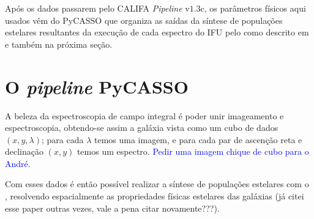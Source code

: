 Após os dados passarem pelo CALIFA {\em Pipeline} v$1.3$c, os parâmetros físicos
aqui usados vêm do PyCASSO que organiza as saídas da síntese de populações
estelares resultantes da execução de cada espectro do IFU pelo \starlight
\citep{CidFernandes2005} como descrito em \citet{CidFernandes2013a} e também na
próxima seção.


\section{O {\em pipeline} PyCASSO}
\label{sec:CALePyC:PyCASSO}

A beleza da espectroscopia de campo integral é poder unir imageamento e
espectroscopia, obtendo-se assim a galáxia vista como um cubo de dados  $(x, y,
\lambda)$; para cada $\lambda$ temos uma imagem, e para cada par de ascenção
reta e declinação $(x, y)$ temos um espectro. \ojo \textcolor{blue}{Pedir uma
imagem chique de cubo para o André.}

Com esses dados é então possível realizar a síntese de populações estelares com
o \starlight, resolvendo espacialmente as propriedades físicas estelares das
galáxias \citep{CidFernandes2013a} (\ojo \textcolor{}{já citei esse paper
outras vezes, vale a pena citar novamente???}).


